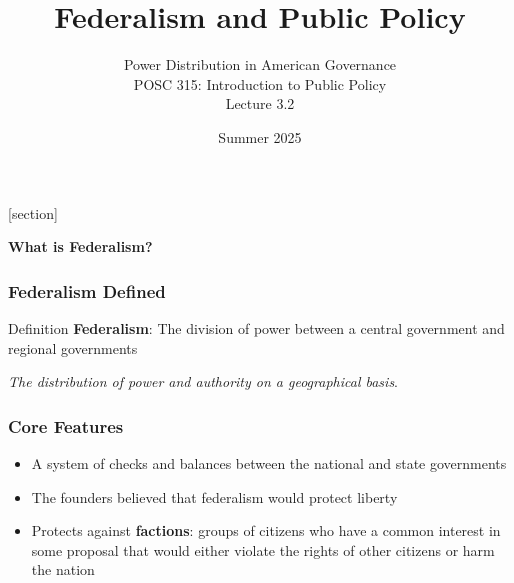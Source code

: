 \documentclass[10pt]{beamer}
\begin{document}
\title{Federalism and Public Policy}
\subtitle{Power Distribution in American Governance\\POSC 315: Introduction to Public Policy\\Lecture 3.2}
\date{Summer 2025}

\maketitle

{
[section]
\begin{frame}[plain]
\vspace{2cm}
\begin{center}
{\Huge\color{white}\textbf{What is Federalism?}}
\end{center}
\end{frame}
}

\begin{frame}
\frametitle{Federalism Defined}

\begin{alertblock}{Definition}
\textbf{Federalism}: The division of power between a central government and regional governments

\vspace{0.3cm}
\emph{The distribution of power and authority on a geographical basis}.
\end{alertblock}

\end{frame}

\begin{frame}
\frametitle{Core Features}

\begin{itemize}
\item<1-> A system of checks and balances between the national and state governments
\item<2-> The founders believed that federalism would protect liberty
\item<3-> Protects against \textcolor{warningcolor}{\textbf{factions}}: groups of citizens who have a common interest in some proposal that would either violate the rights of other citizens or harm the nation
\end{itemize}

\end{frame}
\end{document}
